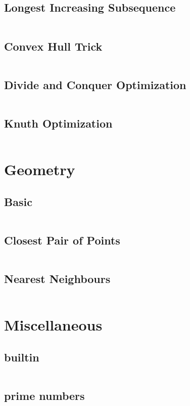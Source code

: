\documentclass[a4paper, 10pt, twocolumn, landscape]{article}
\begin{document}
  \subsection{Longest Increasing Subsequence}
  \inputminted{cpp}{dynamic-programming/lis.cpp}
  \subsection{Convex Hull Trick}
  \inputminted{cpp}{dynamic-programming/convex-hull-trick.cpp}
  \subsection{Divide and Conquer Optimization}
  \inputminted{cpp}{dynamic-programming/divide-and-conquer-optimization.cpp}
  \subsection{Knuth Optimization}
  \inputminted{cpp}{dynamic-programming/knuth-optimization.cpp}

  \section{Geometry}
  \subsection{Basic}
  \inputminted{cpp}{geometry/basics.cpp}
  \subsection{Closest Pair of Points}
  \inputminted{cpp}{geometry/closest-pair.cpp}
  \subsection{Nearest Neighbours}
  \inputminted{cpp}{geometry/neighbour.cpp}

  \section{Miscellaneous}
  \subsection{builtin}
  \inputminted{cpp}{misc/builtin.cpp}
  \subsection{prime numbers}
  \inputminted{text}{misc/prime-numbers.txt}
\end{document}
